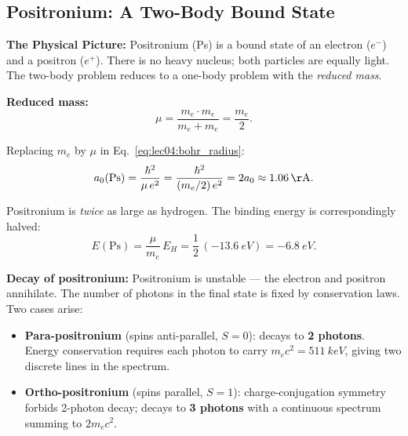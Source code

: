 
\subsection{Positronium: A Two-Body Bound State}

\textbf{The Physical Picture:}
Positronium (Ps) is a bound state of an electron ($e^-$) and a positron
($e^+$).  There is no heavy nucleus; both particles are equally light.  The
two-body problem reduces to a one-body problem with the \emph{reduced mass}.

\textbf{Reduced mass:}
\[
    \mu = \frac{m_e \cdot m_e}{m_e + m_e} = \frac{m_e}{2}.
\]

Replacing $m_e$ by $\mu$ in Eq.~\eqref{eq:lec04:bohr_radius}:
\begin{equation}
    a_0(\text{Ps}) = \frac{\hbar^2}{\mu\, e^2} = \frac{\hbar^2}{(m_e/2)\,e^2}
    = 2a_0 \approx \SI{1.06}{\AA}.
    \label{eq:lec04:bohr_Ps}
\end{equation}

Positronium is \emph{twice} as large as hydrogen.  The binding energy is
correspondingly halved:
\[
    E(\text{Ps}) = \frac{\mu}{m_e}\,E_H = \frac{1}{2}\,(\SI{-13.6}{eV})
    = \SI{-6.8}{eV}.
\]

\textbf{Decay of positronium:}
Positronium is unstable — the electron and positron annihilate.  The number of
photons in the final state is fixed by conservation laws.  Two cases arise:
\begin{itemize}
    \item \textbf{Para-positronium} (spins anti-parallel, $S=0$): decays to
    \textbf{2 photons}.  Energy conservation requires each photon to carry
    $m_e c^2 = \SI{511}{keV}$, giving two discrete lines in the spectrum.
    \item \textbf{Ortho-positronium} (spins parallel, $S=1$): charge-conjugation
    symmetry forbids 2-photon decay; decays to \textbf{3 photons} with a
    continuous spectrum summing to $2m_e c^2$.
\end{itemize}

